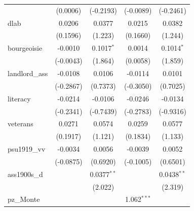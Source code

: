 \begin{table}[htbp]
\begin{tabular}{lcccc}
                                       & (0.0006)              & (-0.2193)              & (-0.0089)             & (-0.2461)\\   
      dlab                             & 0.0206                & 0.0377                 & 0.0215                & 0.0382\\   
                                       & (0.1596)              & (1.223)                & (0.1660)              & (1.244)\\   
      bourgeoisie                      & -0.0010               & 0.1017$^{*}$           & 0.0014                & 0.1014$^{*}$\\   
                                       & (-0.0043)             & (1.864)                & (0.0058)              & (1.859)\\   
      landlord\_ass                    & -0.0108               & 0.0106                 & -0.0114               & 0.0101\\   
                                       & (-0.2867)             & (0.7373)               & (-0.3050)             & (0.7025)\\   
      literacy                         & -0.0214               & -0.0106                & -0.0246               & -0.0134\\   
                                       & (-0.2341)             & (-0.7439)              & (-0.2783)             & (-0.9316)\\   
      veterans                         & 0.0271                & 0.0574                 & 0.0259                & 0.0577\\   
                                       & (0.1917)              & (1.121)                & (0.1834)              & (1.133)\\   
      psu1919\_vv                      & -0.0034               & 0.0056                 & -0.0039               & 0.0052\\   
                                       & (-0.0875)             & (0.6920)               & (-0.1005)             & (0.6501)\\   
      ass1900s\_d                      &                       & 0.0377$^{**}$          &                       & 0.0438$^{**}$\\   
                                       &                       & (2.022)                &                       & (2.319)\\   
      pz\_Monte                        &                       &                        & 1.062$^{***}$         &   \\   

\end{tabular}
\end{table}
